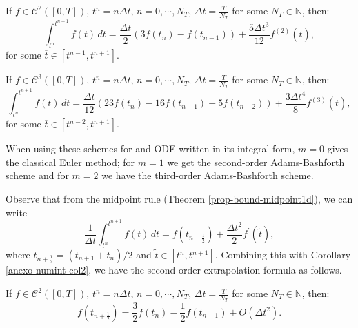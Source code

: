 \begin{corollary}
	\label{anexo-numint-col2}
	If $f\in \mathcal{C}^2([0,T])$, $t^n = n\Delta t$, $n=0, \cdots, N_T$, $\Delta t = \frac{T}{N_T}$ 
	for some $N_T \in \mathbb{N}$, then:
	\begin{equation}
		\int_{t^n}^{t^{n+1}} f(t)\,dt = \frac{\Delta t}{2} (3f(t_{n}) - f(t_{n-1}) )
		+ \frac{5\Delta t^{3}}{12} f^{(2)}(\overline{t}),
	\end{equation}
	for some $\overline{t} \in [t^{n-1}, t^{n+1}]$.
\end{corollary}

\begin{corollary}
	\label{anexo-numint-col3}
	If $f\in \mathcal{C}^3([0,T])$, $t^n = n\Delta t$, $n=0, \cdots, N_T$, $\Delta t = \frac{T}{N_T}$ 
	for some $N_T \in \mathbb{N}$, then:
	\begin{equation}
		\int_{t^n}^{t^{n+1}} f(t)\,dt = \frac{\Delta t}{12} (23f(t_{n}) - 16f(t_{n-1}) + 5f(t_{n-2}) )
		+ \frac{3\Delta t^{4}}{8} f^{(3)}(\overline{t}),
	\end{equation}
	for some $\overline{t} \in [t^{n-2}, t^{n+1}]$.
\end{corollary}

When using these schemes for and ODE written in its integral form,
$m=0$ gives the classical Euler method; for $m=1$ we get the second-order Adams-Bashforth scheme
and for $m=2$ we have the third-order Adams-Bashforth scheme.

Observe that from the midpoint rule (Theorem  \ref{prop-bound-midpoint1d}),
we can write
\begin{equation}
	\frac{1}{\Delta t}\int_{t^n}^{t^{n+1}} f(t)\,dt = f(t_{n+\frac{1}{2}})
	+ \frac{\Delta t^{2}}{2} f^{'}(\tilde{t}),
\end{equation}
where $t_{n+\frac{1}{2}} = (t_{n+1} + t_{n})/2$ and $\tilde{t} \in [t^n, t^{n+1}]$.
Combining this with Corollary \ref{anexo-numint-col2}, we have the second-order extrapolation formula as follows.
\begin{corollary}
	\label{anexo-numint-col4}
	If $f\in \mathcal{C}^2([0,T])$, $t^n = n\Delta t$, $n=0, \cdots, N_T$, $\Delta t = \frac{T}{N_T}$ 
	for some $N_T \in \mathbb{N}$, then:
	\begin{equation}
		f(t_{n+\frac{1}{2}}) = \frac{3}{2}f(t_{n}) - \frac{1}{2}f(t_{n-1}) + O(\Delta t^2).
	\end{equation}
\end{corollary}

